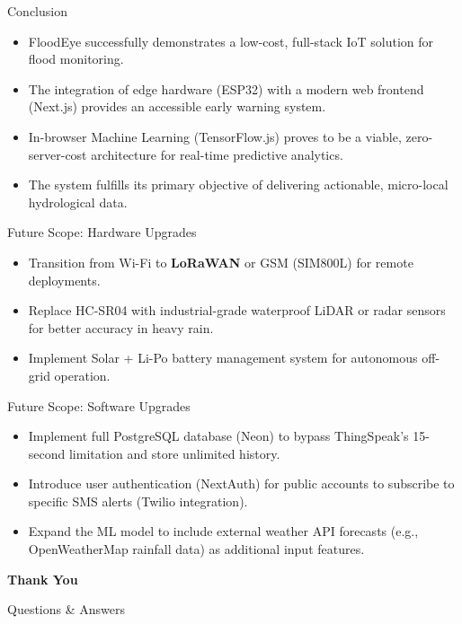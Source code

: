 \documentclass[aspectratio=169]{beamer}
\begin{document}
\begin{frame}{Conclusion}
  \begin{itemize}
    \item FloodEye successfully demonstrates a low-cost, full-stack IoT solution for flood monitoring.
    \item The integration of edge hardware (ESP32) with a modern web frontend (Next.js) provides an accessible early warning system.
    \item In-browser Machine Learning (TensorFlow.js) proves to be a viable, zero-server-cost architecture for real-time predictive analytics.
    \item The system fulfills its primary objective of delivering actionable, micro-local hydrological data.
  \end{itemize}
\end{frame}

\begin{frame}{Future Scope: Hardware Upgrades}
  \begin{itemize}
    \item Transition from Wi-Fi to \textbf{LoRaWAN} or GSM (SIM800L) for remote deployments.
    \item Replace HC-SR04 with industrial-grade waterproof LiDAR or radar sensors for better accuracy in heavy rain.
    \item Implement Solar + Li-Po battery management system for autonomous off-grid operation.
  \end{itemize}
\end{frame}

\begin{frame}{Future Scope: Software Upgrades}
  \begin{itemize}
    \item Implement full PostgreSQL database (Neon) to bypass ThingSpeak's 15-second limitation and store unlimited history.
    \item Introduce user authentication (NextAuth) for public accounts to subscribe to specific SMS alerts (Twilio integration).
    \item Expand the ML model to include external weather API forecasts (e.g., OpenWeatherMap rainfall data) as additional input features.
  \end{itemize}
\end{frame}

\begin{frame}
  \centering
  \Huge \textbf{Thank You}
  
  \vspace{1cm}
  \Large Questions \& Answers
\end{frame}
\end{document}
